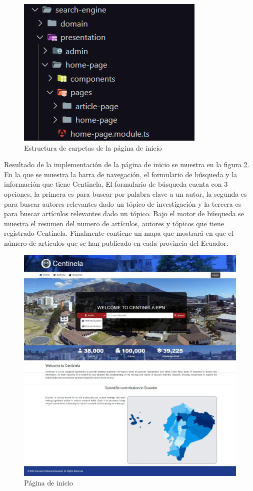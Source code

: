 \begin{figure}[H]
    \centering
    \includegraphics[scale=0.8]{../02Figures/02Chapter/Sprints/Sprint-1/home-page-ha.png}
    \caption{Estructura de carpetas de la página de inicio}
    \label{fig:hexagonal-architecture-home}
\end{figure}

Resultado de la implementación de la página de inicio se muestra en la figura \ref{fig:home-page}.
En la que se muestra la barra de navegación, el formulario de búsqueda y la información que tiene Centinela. El formulario de búsqueda cuenta con 3 opciones, 
la primera es para buscar por palabra clave a un autor, la segunda es para buscar autores relevantes dado un tópico de investigación y la tercera es para buscar artículos relevantes dado un tópico.
Bajo el motor de búsqueda se muestra el resumen del numero de artículos, autores y tópicos que tiene registrado Centinela.
Finalmente contiene un mapa que mostrará en que el número de artículos que se han publicado en cada provincia del Ecuador.
\begin{figure}[H]
    \centering
    \includegraphics[scale=0.160]{../02Figures/02Chapter/Sprints/Sprint-1/home-page.jpeg}
    \caption{Página de inicio}
    \label{fig:home-page}
\end{figure}

